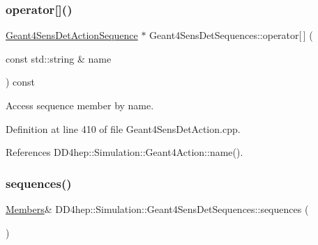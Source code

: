 \hypertarget{class_d_d4hep_1_1_simulation_1_1_geant4_sens_det_sequences_ad3d42dda04a3f8ae499fcb098d818098}{}\label{class_d_d4hep_1_1_simulation_1_1_geant4_sens_det_sequences_ad3d42dda04a3f8ae499fcb098d818098} 
\subsubsection{\texorpdfstring{operator[]()}{operator[]()}}
{\footnotesize\ttfamily \hyperlink{class_d_d4hep_1_1_simulation_1_1_geant4_sens_det_action_sequence}{Geant4\+Sens\+Det\+Action\+Sequence} $\ast$ Geant4\+Sens\+Det\+Sequences\+::operator\mbox{[}$\,$\mbox{]} (\begin{DoxyParamCaption}\item[{const std\+::string \&}]{name }\end{DoxyParamCaption}) const}



Access sequence member by name. 



Definition at line 410 of file Geant4\+Sens\+Det\+Action.\+cpp.



References D\+D4hep\+::\+Simulation\+::\+Geant4\+Action\+::name().

\hypertarget{class_d_d4hep_1_1_simulation_1_1_geant4_sens_det_sequences_a40e7646be1758328d5bf58213b320bf9}{}\label{class_d_d4hep_1_1_simulation_1_1_geant4_sens_det_sequences_a40e7646be1758328d5bf58213b320bf9} 
\subsubsection{\texorpdfstring{sequences()}{sequences()}\hspace{0.1cm}{\footnotesize\ttfamily [1/2]}}
{\footnotesize\ttfamily \hyperlink{class_d_d4hep_1_1_simulation_1_1_geant4_sens_det_sequences_a2266138a517dd9b784af9234312fdd12}{Members}\& D\+D4hep\+::\+Simulation\+::\+Geant4\+Sens\+Det\+Sequences\+::sequences (\begin{DoxyParamCaption}{ }\end{DoxyParamCaption})\hspace{0.3cm}{\ttfamily [inline]}}



